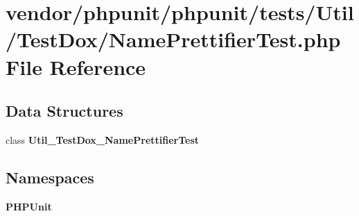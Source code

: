\section{vendor/phpunit/phpunit/tests/\+Util/\+Test\+Dox/\+Name\+Prettifier\+Test.php File Reference}
\label{_name_prettifier_test_8php}
\subsection*{Data Structures}
\begin{DoxyCompactItemize}
\item 
class {\bf Util\+\_\+\+Test\+Dox\+\_\+\+Name\+Prettifier\+Test}
\end{DoxyCompactItemize}
\subsection*{Namespaces}
\begin{DoxyCompactItemize}
\item 
 {\bf P\+H\+P\+Unit}
\end{DoxyCompactItemize}
